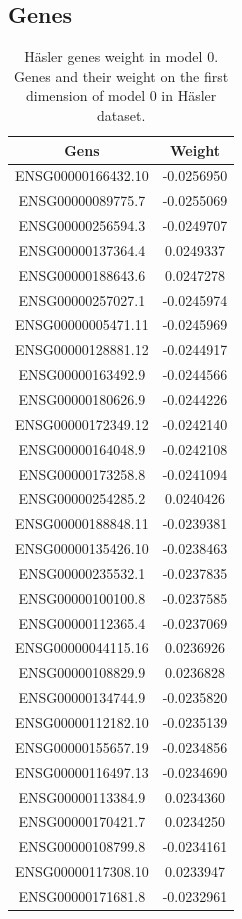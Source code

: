\documentclass[
  12pt,
  a4paper,
  twoside,
  openright]{book}
\begin{document}
\hypertarget{genes-1}{%
\subsection{Genes}\label{genes-1}}

\begin{longtable}[t]{cc}
\caption[Häsler genes weight in model 0]{\label{tab:hasler-genes}Häsler genes weight in model 0. Genes and their weight on the first dimension of model 0 in Häsler dataset.}\\
\toprule
Gens & Weight\\
\midrule
ENSG00000166432.10 & -0.0256950\\
ENSG00000089775.7 & -0.0255069\\
ENSG00000256594.3 & -0.0249707\\
ENSG00000137364.4 & 0.0249337\\
ENSG00000188643.6 & 0.0247278\\
\addlinespace
ENSG00000257027.1 & -0.0245974\\
ENSG00000005471.11 & -0.0245969\\
ENSG00000128881.12 & -0.0244917\\
ENSG00000163492.9 & -0.0244566\\
ENSG00000180626.9 & -0.0244226\\
\addlinespace
ENSG00000172349.12 & -0.0242140\\
ENSG00000164048.9 & -0.0242108\\
ENSG00000173258.8 & -0.0241094\\
ENSG00000254285.2 & 0.0240426\\
ENSG00000188848.11 & -0.0239381\\
\addlinespace
ENSG00000135426.10 & -0.0238463\\
ENSG00000235532.1 & -0.0237835\\
ENSG00000100100.8 & -0.0237585\\
ENSG00000112365.4 & -0.0237069\\
ENSG00000044115.16 & 0.0236926\\
\addlinespace
ENSG00000108829.9 & 0.0236828\\
ENSG00000134744.9 & -0.0235820\\
ENSG00000112182.10 & -0.0235139\\
ENSG00000155657.19 & -0.0234856\\
ENSG00000116497.13 & -0.0234690\\
\addlinespace
ENSG00000113384.9 & 0.0234360\\
ENSG00000170421.7 & 0.0234250\\
ENSG00000108799.8 & -0.0234161\\
ENSG00000117308.10 & 0.0233947\\
ENSG00000171681.8 & -0.0232961\\
\bottomrule
\end{longtable}
\end{document}
